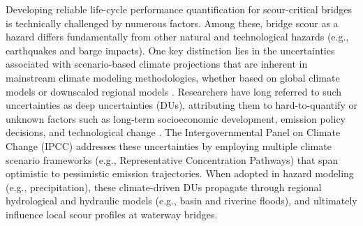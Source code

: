\documentclass[authoryear,preprint,review,12pt]{elsarticle}
\begin{document}
Developing reliable life-cycle performance quantification for scour-critical bridges is technically challenged by numerous factors. Among these, bridge scour as a hazard differs fundamentally from other natural and technological hazards (e.g., earthquakes and barge impacts). One key distinction lies in the uncertainties associated with scenario-based climate projections that are inherent in mainstream climate modeling methodologies, whether based on global climate models or downscaled regional models \citep{alizadeh2022advances,o2020achievements}. Researchers have long referred to such uncertainties as deep uncertainties (DUs), attributing them to hard-to-quantify or unknown factors such as long-term socioeconomic development, emission policy decisions, and technological change \citep{kandlikar2005representing}. The Intergovernmental Panel on Climate Change (IPCC) addresses these uncertainties by employing multiple climate scenario frameworks (e.g., Representative Concentration Pathways) that span optimistic to pessimistic emission trajectories. When adopted in hazard modeling (e.g., precipitation), these climate-driven DUs propagate through regional hydrological and hydraulic models (e.g., basin and riverine floods), and ultimately influence local scour profiles at waterway bridges.
\end{document}
